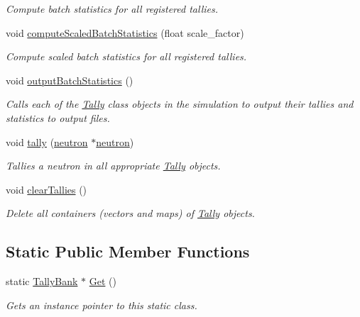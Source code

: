 \begin{DoxyCompactItemize}
\begin{DoxyCompactList}\small\item\em Compute batch statistics for all registered tallies. \end{DoxyCompactList}\item 
void \hyperlink{classTallyBank_a26bdf7c7f02b528c552ee44f0d014af1}{compute\-Scaled\-Batch\-Statistics} (float scale\-\_\-factor)
\begin{DoxyCompactList}\small\item\em Compute scaled batch statistics for all registered tallies. \end{DoxyCompactList}\item 
void \hyperlink{classTallyBank_abf05a2ab1390f0703cf550b1c312f191}{output\-Batch\-Statistics} ()
\begin{DoxyCompactList}\small\item\em Calls each of the \hyperlink{classTally}{Tally} class objects in the simulation to output their tallies and statistics to output files. \end{DoxyCompactList}\item 
void \hyperlink{classTallyBank_a929908afec2f18a4321b29beb52877f2}{tally} (\hyperlink{structneutron}{neutron} $\ast$\hyperlink{structneutron}{neutron})
\begin{DoxyCompactList}\small\item\em Tallies a neutron in all appropriate \hyperlink{classTally}{Tally} objects. \end{DoxyCompactList}\item 
\hypertarget{classTallyBank_a0e3309a94c772eedd2e0f6f4d6003f7d}{void \hyperlink{classTallyBank_a0e3309a94c772eedd2e0f6f4d6003f7d}{clear\-Tallies} ()}\label{classTallyBank_a0e3309a94c772eedd2e0f6f4d6003f7d}

\begin{DoxyCompactList}\small\item\em Delete all containers (vectors and maps) of \hyperlink{classTally}{Tally} objects. \end{DoxyCompactList}\end{DoxyCompactItemize}
\subsection*{Static Public Member Functions}
\begin{DoxyCompactItemize}
\item 
static \hyperlink{classTallyBank}{Tally\-Bank} $\ast$ \hyperlink{classTallyBank_aa1d0673d8b28528416e5862e30c63aa2}{Get} ()
\begin{DoxyCompactList}\small\item\em Gets an instance pointer to this static class. \end{DoxyCompactList}\end{DoxyCompactItemize}
